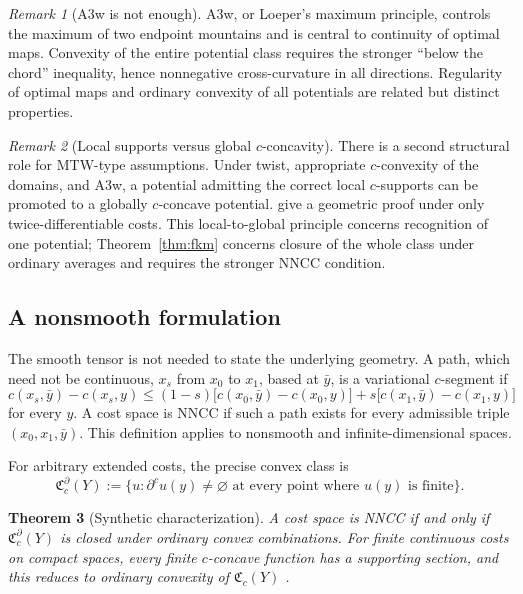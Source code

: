 \documentclass[11pt,a4paper]{article}
\newtheorem{theorem}{Theorem}[section]
\theoremstyle{definition}
\theoremstyle{remark}
\newtheorem{remark}[theorem]{Remark}
\newcommand{\Cfrak}{\mathfrak C}
\begin{document}
\begin{remark}[A3w is not enough]
A3w, or Loeper's maximum principle, controls the maximum of two endpoint
mountains and is central to continuity of optimal maps. Convexity of the entire
potential class requires the stronger ``below the chord'' inequality, hence
nonnegative cross-curvature in all directions. Regularity of optimal maps and
ordinary convexity of all potentials are related but distinct properties.
\end{remark}

\begin{remark}[Local supports versus global $c$-concavity]
There is a second structural role for MTW-type assumptions. Under twist,
appropriate $c$-convexity of the domains, and A3w, a potential admitting the
correct local $c$-supports can be promoted to a globally $c$-concave
potential. \citet{LoeperTrudinger2021} give a geometric proof under only
twice-differentiable costs. This local-to-global principle concerns recognition
of one potential; Theorem~\ref{thm:fkm} concerns closure of the whole class
under ordinary averages and requires the stronger NNCC condition.
\end{remark}

\subsection{A nonsmooth formulation}

The smooth tensor is not needed to state the underlying geometry. A path,
which need not be continuous, $x_s$ from $x_0$ to $x_1$, based at $\bar y$,
is a variational $c$-segment if
\begin{equation}\label{eq:variational-c-segment}
  c(x_s,\bar y)-c(x_s,y)
  \leq(1-s)\bigl[c(x_0,\bar y)-c(x_0,y)\bigr]
       +s\bigl[c(x_1,\bar y)-c(x_1,y)\bigr]
\end{equation}
for every $y$. A cost space is NNCC if such a path exists for every admissible
triple $(x_0,x_1,\bar y)$. This definition applies to nonsmooth and
infinite-dimensional spaces.

For arbitrary extended costs, the precise convex class is
\[
  \Cfrak_c^\partial(Y)
  :=\{u:\partial^cu(y)\neq\varnothing
       \text{ at every point where }u(y)\text{ is finite}\}.
\]

\begin{theorem}[Synthetic characterization]\label{thm:synthetic}
A cost space is NNCC if and only if $\Cfrak_c^\partial(Y)$ is closed under
ordinary convex combinations. For finite continuous costs on compact spaces,
every finite $c$-concave function has a supporting section, and this reduces to
ordinary convexity of $\Cfrak_c(Y)$
\citep{LegerTodeschiVialard2025}.
\end{theorem}
\end{document}
